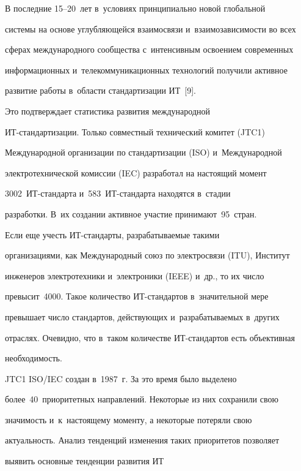      


      В последние 15--20~лет в~условиях принципиально новой глобальной 


системы на основе углубляющейся взаимосвязи и~взаимозависимости во всех 


сферах международного сообщества с~интенсивным освоением современных 


информационных и~телекоммуникационных технологий получили активное 


развитие работы в~области стандартизации ИТ~[9]. 


Это подтверждает статистика развития международной  


ИТ-стан\-дар\-ти\-за\-ции. Только совместный технический комитет (JTC1) 


Международной организации по стандартизации (ISO) и~Международной 


электротехнической комиссии (IEC) разработал на настоящий момент 


3002~ИТ-стан\-дар\-та и~583~ИТ-стан\-дар\-та находятся в~стадии 


разработки. В~их создании активное участие принимают~95~стран.


      


      Если еще учесть ИТ-стандарты, разрабатываемые такими 


организациями, как Международный союз по электросвязи (ITU), Институт 


инженеров электротехники и~электроники (IEEE) и~др., то их число 


превысит~4000. Такое количество ИТ-стан\-дар\-тов в~значительной мере 


превышает число стандартов, действующих и~разрабатываемых в~других 


отраслях. Очевидно, что в~таком количестве ИТ-стандартов есть объективная 


необходимость.


      


      JTC1 ISO\!/\!IEC создан в~1987~г. За это время было выделено 


более~40~приоритетных направлений. Некоторые из них сохранили свою 


значимость и~к~настоящему моменту, а некоторые потеряли свою 


актуальность. Анализ тенденций изменения таких приоритетов позволяет 


выявить основные тенденции развития ИТ


